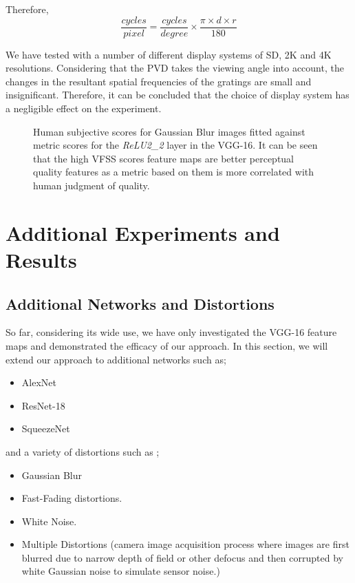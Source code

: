 \documentclass[10pt,twocolumn,letterpaper]{article}
\begin{document}
Therefore,
\begin{equation}
   \frac{cycles}{pixel} = \frac{cycles}{degree} \times \frac{\pi \times d \times r}{180}
\end{equation}

We have tested with a number of different display systems of SD, 2K and 4K resolutions. Considering that the PVD takes the viewing angle into account, the changes in the resultant spatial frequencies of the gratings are small and insignificant. Therefore, it can be concluded that the choice of display system has a negligible effect on the experiment.

\begin{figure}[bt!]

  \hfill
  \caption{Human subjective scores for Gaussian Blur images fitted against metric scores for the \textit{ReLU2\_2} layer in the VGG-16. It can be seen that the high VFSS scores feature maps are better perceptual quality features as a metric based on them is more correlated with human judgment of quality. }
\end{figure}

\section{Additional Experiments and Results}
\subsection{Additional Networks and Distortions}
So far, considering its wide use, we have only investigated the VGG-16 feature maps and demonstrated the efficacy of our approach. In this section, we will extend our approach to additional networks such as;
\begin{itemize}
 \item AlexNet \cite{35}
 \item ResNet-18 \cite{33}
 \item SqueezeNet \cite{34}
\end{itemize}

and a variety of distortions such as ;
\begin{itemize}
 \item{Gaussian Blur}
 \item Fast-Fading distortions.
 \item White Noise.
 \item Multiple Distortions (camera image acquisition process where images are first blurred due to narrow depth of field or other defocus and then corrupted by white Gaussian noise to simulate sensor noise.)
\end{itemize}
\end{document}
